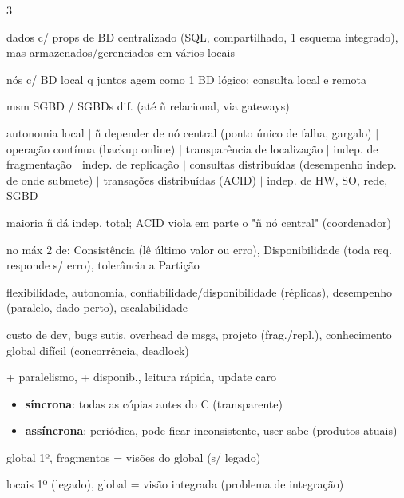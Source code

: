 \documentclass[a4paper]{article}
\newenvironment{dl}{\begin{description}[leftmargin=3.2mm,labelindent=0pt,itemsep=0.7pt,topsep=0.6pt,font=\color{tm}\bfseries,style=standard]}{\end{description}}
\newcommand{\h}[1]{\par\vspace{2.2pt}{\setlength{\fboxsep}{0.9pt}\colorbox{hd}{\parbox{\dimexpr\linewidth-1.8pt}{\color{white}\bfseries\ #1}}}\par\vspace{0.8pt}}
\begin{document}
\newpage
\fontsize{6.95}{7.7}\selectfont
\begin{multicols*}{3}
\h{BDD: CONCEITOS}
\begin{dl}
\item[BDD:] dados c/ props de BD centralizado (SQL, compartilhado, 1 esquema integrado), mas armazenados/gerenciados em vários locais
\item[SBDD:] nós c/ BD local q juntos agem como 1 BD lógico; consulta local e remota
\item[homog./heterog.:] msm SGBD / SGBDs dif. (até ñ relacional, via gateways)
\item[Date \& Codd:] autonomia local $|$ ñ depender de nó central (ponto único de falha, gargalo) $|$ operação contínua (backup online) $|$ transparência de localização $|$ indep. de fragmentação $|$ indep. de replicação $|$ consultas distribuídas (desempenho indep. de onde submete) $|$ transações distribuídas (ACID) $|$ indep. de HW, SO, rede, SGBD
\item[na prática:] maioria ñ dá indep. total; ACID viola em parte o "ñ nó central" (coordenador)
\item[CAP:] no máx 2 de: Consistência (lê último valor ou erro), Disponibilidade (toda req. responde s/ erro), tolerância a Partição
\item[+:] flexibilidade, autonomia, confiabilidade/disponibilidade (réplicas), desempenho (paralelo, dado perto), escalabilidade
\item[--:] custo de dev, bugs sutis, overhead de msgs, projeto (frag./repl.), conhecimento global difícil (concorrência, deadlock)
\item[replicação:] + paralelismo, + disponib., leitura rápida, update caro
\begin{itemize}
\item \textbf{síncrona}: todas as cópias antes do C (transparente)
\item \textbf{assíncrona}: periódica, pode ficar inconsistente, user sabe (produtos atuais)
\end{itemize}
\item[LAV:] global 1º, fragmentos = visões do global (s/ legado)
\item[GAV:] locais 1º (legado), global = visão integrada (problema de integração)
\end{dl}


\end{multicols*}
\end{document}

